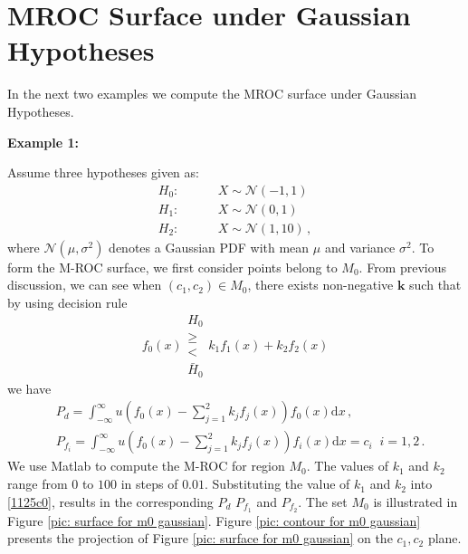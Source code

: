 \section{MROC Surface  under Gaussian Hypotheses}
In the next two examples we compute the MROC surface under Gaussian Hypotheses. 

\noindent \textbf{Example 1:}

Assume three hypotheses given as:
\begin{equation}
\label{equ: Gaussian Hypothesis}
\begin{split}
	H_0:\;\;\;\;\;\;\;\;&X \sim \mathcal{N}(-1,1)\\
    H_1:\;\;\;\;\;\;\;\;&X \sim \mathcal{N}(0,1)\\
    H_2:\;\;\;\;\;\;\;\;&X \sim \mathcal{N}(1,10)\,,
\end{split}
\end{equation}
where $\mathcal{N}(\mu,\sigma^2)$ denotes a Gaussian PDF with mean $\mu$ and variance $\sigma^2$.
To form the M-ROC surface, we first consider points belong to $M_0$.
From previous discussion, we can see when $(c_1, c_2) \in M_0$, there exists non-negative $\mathbf{k}$ such that by using decision rule 
\begin{equation}
f_0(x) \substack{H_0 \\ \geq \\ < \\ \bar{H}_0} k_1f_1(x) + k_2f_2(x)
\end{equation}
we have 
\begin{equation}
\begin{split}
\label{1125c0}
&P_d = \int_{-\infty}^{\infty} u(f_0(x) - \sum_{j=1}^{2}k_jf_j(x)) f_0(x)\mathrm{d}x    \,, \\
&P_{f_i} = \int_{-\infty}^{\infty} u(f_0(x) - \sum_{j=1}^{2}k_jf_j(x)) f_i(x) \mathrm{d}x = c_i\;\;    i=1, 2\,.
\end{split}
\end{equation}
We use Matlab to compute the M-ROC for region $M_0$. The values of $k_1$ and $k_2$ range from $0$ to $100$ in steps of $0.01$. Substituting the value of $k_1$ and $k_2$ into \eqref{1125c0}, results in the corresponding $P_d$ $P_{f_1}$ and $P_{f_2}$.  The set $M_0$ is illustrated in Figure \ref{pic: surface for m0 gaussian}. Figure \ref{pic: contour for m0 gaussian} presents the projection of Figure \ref{pic: surface for m0 gaussian} on the $c_1, c_2$ plane.

